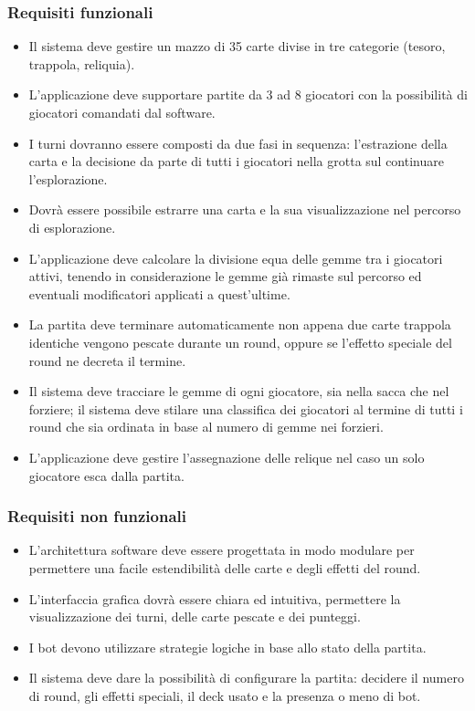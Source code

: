 \documentclass[a4paper,12pt]{report}
\begin{document}
\subsubsection{Requisiti funzionali}
\begin{itemize}
	\item Il sistema deve gestire un mazzo di 35 carte divise in tre categorie (tesoro, trappola, reliquia).
	\item L'applicazione deve supportare partite da 3 ad 8 giocatori con la possibilità di giocatori comandati dal software.
	\item I turni dovranno essere composti da due fasi in sequenza: l'estrazione della carta
	e la decisione da parte di tutti i giocatori nella grotta sul continuare l'esplorazione. 
	\item Dovrà essere possibile estrarre
	una carta e la sua visualizzazione nel percorso di esplorazione.
	\item L'applicazione deve calcolare la divisione equa delle gemme tra i giocatori attivi,
	tenendo in considerazione le gemme già rimaste sul percorso ed eventuali modificatori
	applicati a quest'ultime.
	\item La partita deve terminare automaticamente non appena due carte trappola identiche
	vengono pescate durante un round, oppure se l'effetto speciale del round ne decreta il termine.
	\item Il sistema deve tracciare le gemme di ogni giocatore, sia nella sacca che nel forziere;
	il sistema deve stilare una classifica dei giocatori al termine di tutti i round
	che sia ordinata in base al numero di gemme nei forzieri.
	\item L'applicazione deve gestire l'assegnazione delle relique nel caso un solo giocatore
	esca dalla partita. 
\end{itemize}

\subsubsection{Requisiti non funzionali}
\begin{itemize}
	\item L'architettura software deve essere progettata in modo modulare
	per permettere una facile estendibilità delle carte e degli effetti del round.
	\item L'interfaccia grafica dovrà essere chiara ed intuitiva, permettere la visualizzazione dei turni, delle carte pescate e dei punteggi.
	\item I bot devono utilizzare strategie logiche in base allo stato della partita.
	\item Il sistema deve dare la possibilità di configurare la partita: decidere il numero di round,
	gli effetti speciali, il deck usato e la presenza o meno di bot.
\end{itemize}
\end{document}
